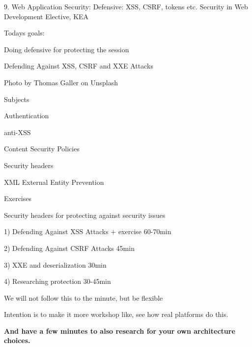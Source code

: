 \documentclass[Screen16to9,17pt]{foils}
\begin{document}
\mytitlepage
{9. Web Application Security: Defensive: XSS, CSRF, tokens etc.}
{Security in Web Development Elective, KEA}




Todays goals:
\begin{list2}
\item Doing defensive for protecting the session
\item Defending Against XSS, CSRF and XXE Attacks
\end{list2}

Photo by Thomas Galler on Unsplash




\begin{list1}
\item Subjects
\begin{list2}
\item Authentication
\item anti-XSS
\item Content Security Policies
\item Security headers
\item XML External Entity Prevention
\end{list2}
\item Exercises
\begin{list2}
\item Security headers for protecting against security issues
\end{list2}
\end{list1}


\begin{list2}
\item 1) Defending Against XSS Attacks + exercise 60-70min
\item 2) Defending Against CSRF Attacks 45min
\item 3) XXE and deserialization 30min
\item 4) Researching protection 30-45min
\end{list2}

We will not follow this to the minute, but be flexible

Intention is to make it more workshop like, see how real platforms do this.

{\bf And have a few minutes to also research for your own architecture choices.}
\end{document}
